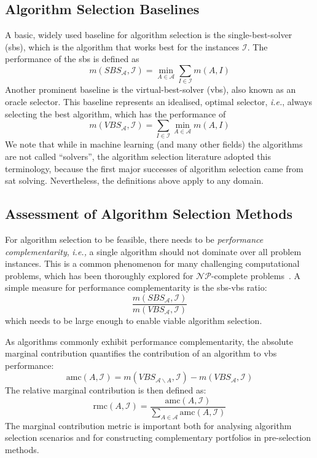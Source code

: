 \subsection{Algorithm Selection Baselines}
A basic, widely used baseline for algorithm selection is the single-best-solver (\gls{sbs}), which is the algorithm that works best for the instances $\mathcal{I}$. The performance of the \gls{sbs} is defined as 
$$m(SBS_\mathcal{A}, \mathcal{I})=\min_{A\in\mathcal{A}} \sum_{I\in\mathcal{I}} m(A, I)$$
Another prominent baseline is the virtual-best-solver (\gls{vbs}), also known as an oracle selector. This baseline represents an idealised, optimal selector, \emph{i.e.}, always selecting the best algorithm, which has the performance of
$$m(VBS_\mathcal{A}, \mathcal{I})= \sum_{I\in\mathcal{I}} \min_{A\in\mathcal{A}} m(A, I)$$
We note that while in machine learning (and many other fields) the algorithms are not called ``solvers'', the algorithm selection literature adopted this terminology, because the first major successes of algorithm selection came from \gls{sat} solving. Nevertheless, the definitions above apply to any domain.

\subsection{Assessment of Algorithm Selection Methods}
For algorithm selection to be feasible, there needs to be \textit{performance complementarity}, \emph{i.e.,} a single algorithm should not dominate over all problem instances.
This is a common phenomenon for many challenging computational problems, which has been thoroughly explored for $\mathcal{NP}$-complete problems~\citep{Kotthoff16,KetEtAl19}.
A simple measure for performance complementarity is the \gls{sbs}-\gls{vbs} ratio:
$$\frac{m(SBS_\mathcal{A}, \mathcal{I})}{m(VBS_\mathcal{A}, \mathcal{I})}$$
which needs to be large enough to enable viable algorithm selection.


As algorithms commonly exhibit performance complementarity, the absolute marginal contribution quantifies the contribution of an algorithm to \gls{vbs} performance:
$$\text{amc}(A, \mathcal{I}) =  m(VBS_{\mathcal{A} \backslash A}, \mathcal{I})-m(VBS_\mathcal{A}, \mathcal{I})$$
The relative marginal contribution is then defined as:
$$\text{rmc}(A, \mathcal{I})=\frac{\text{amc}(A, \mathcal{I})}{\sum_{A\in \mathcal{A}}\text{amc}(A, \mathcal{I})}$$
The marginal contribution metric is important both for analysing algorithm selection scenarios and for constructing complementary portfolios in pre-selection methods.

